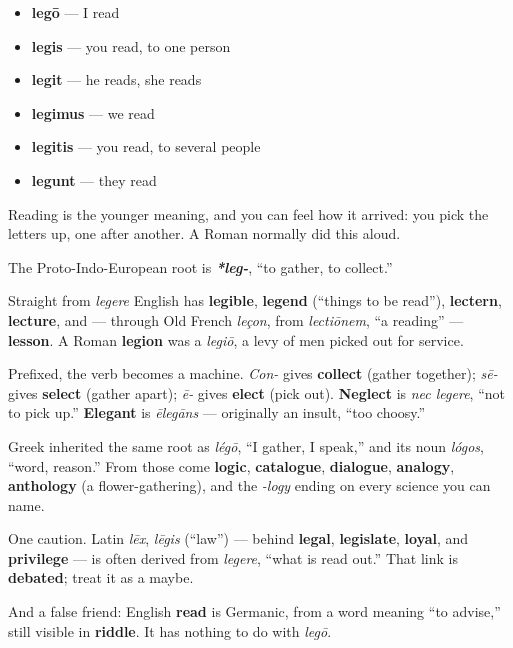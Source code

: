 \begin{itemize}
\raggedright
  \item \textbf{legō} — I read
  \item \textbf{legis} — you read, to one person
  \item \textbf{legit} — he reads, she reads
  \item \textbf{legimus} — we read
  \item \textbf{legitis} — you read, to several people
  \item \textbf{legunt} — they read
\end{itemize}

Reading is the younger meaning, and you can feel how it arrived: you pick the letters up, one after another. A Roman normally did this aloud.

\begin{cousinweb}
The Proto-Indo-European root is \emph{\textbf{*leg-}}, \textquotedblleft{}to gather, to collect.\textquotedblright{}

Straight from \emph{legere} English has \textbf{legible}, \textbf{legend} (\textquotedblleft{}things to be read\textquotedblright{}), \textbf{lectern}, \textbf{lecture}, and — through Old French \emph{leçon}, from \emph{lectiōnem}, \textquotedblleft{}a reading\textquotedblright{} — \textbf{lesson}. A Roman \textbf{legion} was a \emph{legiō}, a levy of men picked out for service.

Prefixed, the verb becomes a machine. \emph{Con-} gives \textbf{collect} (gather together); \emph{sē-} gives \textbf{select} (gather apart); \emph{ē-} gives \textbf{elect} (pick out). \textbf{Neglect} is \emph{nec legere}, \textquotedblleft{}not to pick up.\textquotedblright{} \textbf{Elegant} is \emph{ēlegāns} — originally an insult, \textquotedblleft{}too choosy.\textquotedblright{}

Greek inherited the same root as \emph{légō}, \textquotedblleft{}I gather, I speak,\textquotedblright{} and its noun \emph{lógos}, \textquotedblleft{}word, reason.\textquotedblright{} From those come \textbf{logic}, \textbf{catalogue}, \textbf{dialogue}, \textbf{analogy}, \textbf{anthology} (a flower-gathering), and the \emph{-logy} ending on every science you can name.

One caution. Latin \emph{lēx}, \emph{lēgis} (\textquotedblleft{}law\textquotedblright{}) — behind \textbf{legal}, \textbf{legislate}, \textbf{loyal}, and \textbf{privilege} — is often derived from \emph{legere}, \textquotedblleft{}what is read out.\textquotedblright{} That link is \textbf{debated}; treat it as a maybe.

And a false friend: English \textbf{read} is Germanic, from a word meaning \textquotedblleft{}to advise,\textquotedblright{} still visible in \textbf{riddle}. It has nothing to do with \emph{legō}.
\end{cousinweb}


